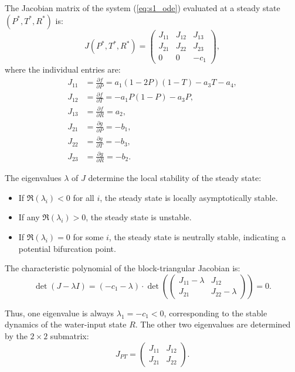 \documentclass[12pt,a4paper]{article}
\begin{document}
The Jacobian matrix of the system (\ref{eq:s1_ode}) evaluated at a steady state $(P^*, T^*, R^*)$ is:
\begin{equation}
	J(P^*, T^*, R^*) = 
	\begin{pmatrix}
		J_{11} & J_{12} & J_{13} \\
		J_{21} & J_{22} & J_{23} \\
		0 & 0 & -c_1
	\end{pmatrix},
	\label{eq:s1_jacobian}
\end{equation}
where the individual entries are:
\begin{equation}
	\begin{aligned}
		J_{11} &= \frac{\partial f}{\partial P} = a_1(1-2P)(1-T) - a_3T - a_4, \\
		J_{12} &= \frac{\partial f}{\partial T} = -a_1P(1-P) - a_3P, \\
		J_{13} &= \frac{\partial f}{\partial R} = a_2, \\
		J_{21} &= \frac{\partial g}{\partial P} = -b_1, \\
		J_{22} &= \frac{\partial g}{\partial T} = -b_3, \\
		J_{23} &= \frac{\partial g}{\partial R} = -b_2.
	\end{aligned}
	\label{eq:s1_jacobian_entries}
\end{equation}

The eigenvalues $\lambda$ of $J$ determine the local stability of the steady state:
\begin{itemize}
	\item If $\Re(\lambda_i) < 0$ for all $i$, the steady state is locally asymptotically stable.
	\item If any $\Re(\lambda_i) > 0$, the steady state is unstable.
	\item If $\Re(\lambda_i) = 0$ for some $i$, the steady state is neutrally stable, indicating a potential bifurcation point.
\end{itemize}

The characteristic polynomial of the block-triangular Jacobian is:
\begin{equation}
	\det(J - \lambda I) = (-c_1 - \lambda) \cdot \det\left( 
	\begin{pmatrix}
		J_{11} - \lambda & J_{12} \\
		J_{21} & J_{22} - \lambda
	\end{pmatrix}
	\right) = 0.
	\label{eq:s1_char_poly}
\end{equation}

Thus, one eigenvalue is always $\lambda_1 = -c_1 < 0$, corresponding to the stable dynamics of the water-input state $R$. The other two eigenvalues are determined by the $2\times 2$ submatrix:
\begin{equation}
	J_{PT} = 
	\begin{pmatrix}
		J_{11} & J_{12} \\
		J_{21} & J_{22}
	\end{pmatrix}.
	\label{eq:s1_JPT}
\end{equation}
\end{document}
